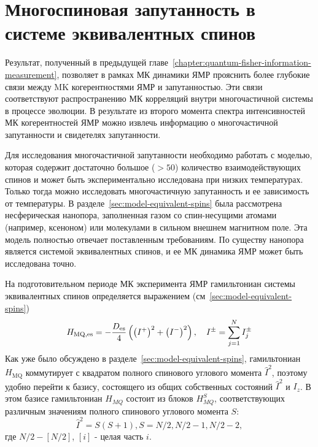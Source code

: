 \chapter{Многоспиновая запутанность в системе эквивалентных спинов}
\label{chapter:manyparticle-entanglement-in-nanopore}
%



Результат, полученный в предыдущей главе~\ref{chapter:quantum-fisher-information-measurement},
позволяет в рамках МК динамики ЯМР прояснить более глубокие связи между MK когерентностями ЯМР и запутанностью.
Эти связи соответствуют распространению МК корреляций внутри многочастичной системы в процессе эволюции.
В результате из второго момента спектра интенсивностей МК когерентностей ЯМР
можно извлечь информацию о многочастичной запутанности и свидетелях запутанности.

Для исследования многочастичной запутанности необходимо работать с моделью,
которая содержит достаточно большое ($>50$) количество взаимодействующих спинов
и может быть экспериментально исследована при низких температурах.
Только тогда можно исследовать многочастичную запутанность и ее зависимость от температуры.
В разделе~\ref{sec:model-equivalent-spins} была рассмотрена несферическая нанопора,
заполненная газом со спин-несущими атомами (например, ксеноном) или молекулами в сильном внешнем магнитном поле.
Эта модель полностью отвечает поставленным требованиям.
По существу нанопора является системой эквивалентных спинов,
и ее МК динамика ЯМР может быть исследована точно.

На подготовительном периоде МК эксперимента ЯМР гамильтониан системы эквивалентных спинов
определяется выражением (см~\ref{sec:model-equivalent-spins})
\begin{equation}\label{eq:mq-hamiltoninan-equivalent-spins}
  H_\mathrm{MQ,es} = - \frac{D_\mathrm{es}}{4} \left(  \left( I^+ \right)^2 + \left( I^- \right)^2  \right), \quad I^\pm = \sum\limits_{j=1}^{N} I^{\pm}_j
\end{equation}
%
\hmqEquivalentSpinsExplanatoryNote
Как уже было обсуждено в разделе~\ref{sec:model-equivalent-spins},
гамильтониан $H_\mathrm{MQ}$
коммутирует с квадратом полного спинового углового момента $\hat I^2$,
поэтому удобно перейти к базису,
состоящего из общих собственных состояний $\hat I^2$ и $I_z$.
В этом базисе гамильтониан $H_{MQ}$ состоит из блоков $H_{MQ}^S$, соответствующих различным значениям полного спинового углового момента $S$:
\begin{equation}
  \hat I^2 = S(S+1), S = N/2, N/2-1, N/2-2,
\end{equation}
где
$N/2 - [N/2]$, $[i]$ - целая часть $i$.

